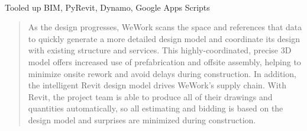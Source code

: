 \documentclass[
]{article}
\makeatletter
\let\oldparagraph\paragraph
\renewcommand{\paragraph}{
    \@ifstar
      \xxxParagraphStar
      \xxxParagraphNoStar
  }
\newcommand{\xxxParagraphStar}[1]{\oldparagraph*{#1}\mbox{}}
\newcommand{\xxxParagraphNoStar}[1]{\oldparagraph{#1}\mbox{}}
\makeatother
\begin{document}
\paragraph{Tooled up BIM, PyRevit, Dynamo, Google Apps
Scripts}\label{tooled-up-bim-pyrevit-dynamo-google-apps-scripts}

\begin{quote}
As the design progresses, WeWork scans the space and references that
data to quickly generate a more detailed design model and coordinate its
design with existing structure and services. This highly-coordinated,
precise 3D model offers increased use of prefabrication and offsite
assembly, helping to minimize onsite rework and avoid delays during
construction. In addition, the intelligent Revit design model drives
WeWork's supply chain. With Revit, the project team is able to produce
all of their drawings and quantities automatically, so all estimating
and bidding is based on the design model and surprises are minimized
during construction.
\end{quote}
\end{document}
